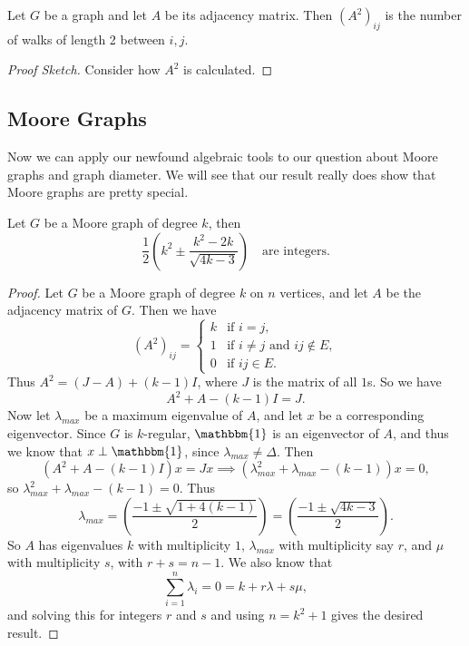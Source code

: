 \documentclass[a4paper]{scrartcl}
\begin{document}
\begin{proposition}
	Let $G$ be a graph and let $A$ be its adjacency matrix. Then $(A^2)_{ij}$ is the number of walks of length 2 between $i, j$.
\end{proposition}
\begin{proof}[Proof Sketch]
Consider how $A^2$ is calculated.	
\end{proof}

\subsection{Moore Graphs}

Now we can apply our newfound algebraic tools to our question about Moore graphs and graph diameter. We will see that our result really does show that Moore graphs are pretty special.

\begin{lemma}
	Let $G$ be a Moore graph of degree $k$, then
	$$
	\frac{1}{2}\left(k^{2} \pm \frac{k^{2}-2 k}{\sqrt{4 k-3}}\right) \quad \text{are integers.}
	$$
\end{lemma}
\begin{proof}
	Let $G$ be a Moore graph of degree $k$ on $n$ vertices, and let $A$ be the adjacency matrix of $G$. Then we have
	$$
	(A^2)_{ij} = \begin{cases}
		k &\mbox{if } i = j, \\
		1 &\mbox{if } i \neq j\text{ and $ij \not \in E$},\\
		0 &\mbox{if } i j \in E.
	   \end{cases}
	$$
	Thus $A^2 = (J - A) + (k - 1)I$, where $J$ is the matrix of all $1$s. So we have
	$$
A^2 + A - (k - 1)I = J.
	$$
	Now let $\lambda_{max}$ be a maximum eigenvalue of $A$, and let $x$ be a corresponding eigenvector. Since $G$ is $k$-regular, $\mathbbm{1}$ is an eigenvector of $A$, and thus we know that $x \perp \mathbbm{1}$, since $\lambda_{max} \neq \Delta$. Then
	$$
	   (A^2 + A - (k - 1)I)x = Jx \implies (\lambda_{max}^2 + \lambda_{max} - (k - 1))x = 0,
	$$
	so $\lambda_{max}^2 + \lambda_{max} - (k - 1) = 0$. Thus
	$$
	   \lambda_{max} = \left(\frac{-1 \pm \sqrt{1+4(k-1)}}{2}\right)=\left(\frac{-1 \pm\sqrt{4 k-3}}{2}\right).
	$$
	So $A$ has eigenvalues $k$ with multiplicity $1$, $\lambda_{max}$ with multiplicity say $r$, and $\mu$ with multiplicity $s$, with $r + s = n - 1$. We also know that
	$$
	   \sum_{i = 1}^n \lambda_i = 0 = k + r\lambda + s\mu,
	$$
	and solving this for integers $r$ and $s$ and using $n = k^2 + 1$ gives the desired result.
\end{proof}
\end{document}
